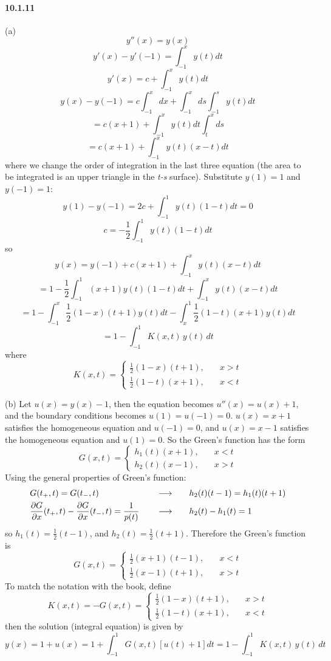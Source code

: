\documentclass[a4paper]{article}
\begin{document}
\paragraph{10.1.11}
(a) 
\[
y''(x)=y(x)
\]
\[
y'(x)-y'(-1)=\int_{-1}^xy(t)dt
\]
\[
y'(x)=c+\int_{-1}^xy(t)dt
\]
\[
y(x)-y(-1)=c\int_{-1}^xdx+\int_{-1}^xds\int_{-1}^sy(t)dt
\]
\[
=c(x+1)+\int_{-1}^xy(t)dt\int_t^xds
\]
\[
=c(x+1)+\int_{-1}^xy(t)(x-t)dt
\]
where we change the order of integration in the last three equation (the area to be integrated is an upper triangle in the \textit{t-s} surface). Substitute $y(1)=1$ and $y(-1)=1$:
\[
y(1)-y(-1)=2c+\int_{-1}^1y(t)(1-t)dt=0
\]
\[
c=-\frac{1}{2}\int_{-1}^1y(t)(1-t)dt
\]
so
\[
y(x)=y(-1)+c(x+1)+\int_{-1}^xy(t)(x-t)dt
\]
\[
=1-\frac{1}{2}\int_{-1}^1(x+1)y(t)(1-t)dt+\int_{-1}^xy(t)(x-t)dt
\]
\[
=1-\int_{-1}^x\frac{1}{2}(1-x)(t+1)y(t)dt-\int_x^1\frac{1}{2}(1-t)(x+1)y(t)dt
\]
\[
=1-\int_{-1}^1K(x,t)\,y(t)\,dt
\]
where
\[
K(x,t)=
\begin{cases}
\frac{1}{2}(1-x)(t+1),\quad & x>t\\
\frac{1}{2}(1-t)(x+1),\quad & x<t
\end{cases}
\]
\medskip

(b) Let $u(x)=y(x)-1$, then the equation becomes $u''(x)=u(x)+1$, and the boundary conditions becomes $u(1)=u(-1)=0$. \;$u(x)=x+1$ satisfies the homogeneous equation and $u(-1)=0$, and $u(x)=x-1$ satisfies the homogeneous equation and $u(1)=0$. So the Green's function has the form
\[
G(x,t)=
\begin{cases}
h_1(t)(x+1),\quad & x<t\\
h_2(t)(x-1),\quad & x>t
\end{cases}
\]
Using the general properties of Green's function:
\begin{alignat*}{3}
    & G(t_+,t)=G(t_-,t)\quad && \longrightarrow\quad && h_2(t)(t-1)=h_1(t)(t+1) \\
    & \frac{\partial G}{\partial x}(t_+,t)-\frac{\partial G}{\partial x}(t_-,t)=\frac{1}{p(t)}\quad && \longrightarrow\quad && h_2(t)-h_1(t)=1
\end{alignat*}
so $h_1(t)=\frac{1}{2}(t-1)$, and $h_2(t)=\frac{1}{2}(t+1)$. Therefore the Green's function is
\[
G(x,t)=
\begin{cases}
\frac{1}{2}(x+1)(t-1),\quad & x<t\\[2pt]
\frac{1}{2}(x-1)(t+1),\quad & x>t
\end{cases}
\]
To match the notation with the book, define
\[
K(x,t)=-G(x,t)=
\begin{cases}
\frac{1}{2}(1-x)(t+1),\quad & x>t\\[2pt]
\frac{1}{2}(1-t)(x+1),\quad & x<t
\end{cases}
\]
then the solution (integral equation) is given by
\[
y(x)=1+u(x)=1+\int_{-1}^1G(x,t)\left[u(t)+1 \right]dt=1-\int_{-1}^1K(x,t)\,y(t)\,dt
\]
\end{document}
